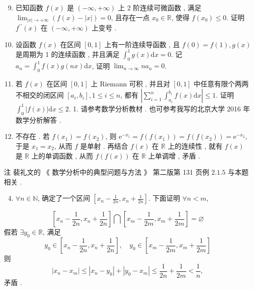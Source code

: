 \documentclass[10pt]{article}
\begin{document}
\begin{enumerate}
  \setcounter{enumi}{8}
  \item  已知函数  $f(x)$  是  $(-\infty,+\infty)$  上  2  阶连续可微函数 ,  满足  $\lim _{|x| \rightarrow+\infty}(f(x)-|x|)=0$,  且存在一点  $x_{0} \in \mathbb{R}$,  使得  $f\left(x_{0}\right) \leqslant 0$.  证明  $f^{\prime \prime}(x)$  在  $(-\infty,+\infty)$  上变号 .

  \item  设函数  $f(x)$  在区间  $[0,1]$  上有一阶连续导函数 ,  且  $f(0)=f(1), g(x)$  是周期为  1  的连续函数 ,  并且满足  $\int_{0}^{1} g(x) \mathrm{d} x=0$.  记  $a_{n}=\int_{0}^{1} f(x) g(n x) \mathrm{d} x$,  证明  $\lim _{n \rightarrow \infty} n a_{n}=0$.

  \item  若  $f(x)$  在区间  $[0,1]$  上  Riemann  可积 ,  并且对  $[0,1]$  中任意有限个两两不相交的闭区间  $\left[a_{i}, b_{i}\right], 1 \leqslant i \leqslant n$,  都有  $\left|\sum_{i=1}^{n} \int_{a_{i}}^{b_{i}} f(x) \mathrm{d} x\right| \leqslant 1$.  证明  $\int_{0}^{1}|f(x)| \mathrm{d} x \leqslant 2$. 1.  请参考数学分析教材 .  也可参考我写的北京大学  2016  年数学分析解答 .

  \item  不存在 .  若  $f\left(x_{1}\right)=f\left(x_{2}\right)$,  则  $\mathrm{e}^{-x_{1}}=f\left(f\left(x_{1}\right)\right)=f\left(f\left(x_{2}\right)\right)=\mathrm{e}^{-x_{2}}$,  于是  $x_{1}=x_{2}$,  从而  $f$  是单射 .  再结合  $f(x)$  在  $\mathbb{R}$  上的连续性 ,  就有  $f(x)$  是  $\mathbb{R}$  上的单调函数 ,  从而  $f(f(x))$  在  $\mathbb{R}$  上单调增 ,  矛盾 .

\end{enumerate}
 注   裴礼文的 《 数学分析中的典型问题与方法 》 第二版第  131  页例  $2.1 .5$  与本题相关 .

\begin{enumerate}
  \setcounter{enumi}{3}
  \item $\forall n \in \mathbb{N}$,  确定了一个区间  $\left[x_{n}-\frac{1}{2 n}, x_{n}+\frac{1}{2 n}\right]$.  下面证明  $\forall n<m$,
\end{enumerate}
$$
\left[x_{n}-\frac{1}{2 n}, x_{n}+\frac{1}{2 n}\right] \bigcap\left[x_{m}-\frac{1}{2 m}, x_{m}+\frac{1}{2 m}\right]=\varnothing
$$
 假若  $\exists y_{0} \in \mathbb{R}$,  满足 
$$
y_{0} \in\left[x_{n}-\frac{1}{2 n}, x_{n}+\frac{1}{2 n}\right], \quad y_{0} \in\left[x_{m}-\frac{1}{2 m}, x_{m}+\frac{1}{2 m}\right]
$$
 则 
$$
\left|x_{n}-x_{m}\right| \leqslant\left|x_{n}-y_{0}\right|+\left|y_{0}-x_{m}\right| \leqslant \frac{1}{2 n}+\frac{1}{2 m}<\frac{1}{n},
$$
 矛盾 .
\end{document}
